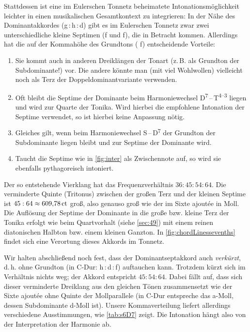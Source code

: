Stattdessen ist eine im Eulerschen Tonnetz beheimatete Intonationsmöglichkeit
leichter in einen musikalischen Gesamtkontext zu integrieren: In der Nähe des
Dominantakkordes (g\,:\,\naturalm h\,:\,d) gibt es im Eulerschen Tonnetz zwar
zwei unterschiedliche kleine Septimen (\natural f und \naturalp f), die in
Betracht kommen.  Allerdings hat die auf der Kommahöhe des Grundtons (\natural
f) entscheidende Vorteile:
\begin{enumerate}
\item Sie kommt auch in anderen Dreiklängen der Tonart (z.\,B. als Grundton der
  Subdominante!) vor.  Die andere könnte man (mit viel Wohlwollen) vielleicht
  noch als Terz der Doppeldominantvariante verwenden.
\item Oft bleibt die Septime der Dominante beim Harmoniewechsel
  D\textsuperscript{$7$}\,–\,T\textsuperscript{$4$–$3$} liegen und wird zur
  Quarte der Tonika.  Wird hierbei die empfohlene Intonation der Septime
  verwendet, so ist hierbei keine Anpassung nötig.
\item Gleiches gilt, wenn beim Harmoniewechsel S\,–\,D\textsuperscript{$7$} der
  Grundton der Subdominante liegen bleibt und zur Septime der Dominante wird.
\item Taucht die Septime wie in \cref{fig:inter} als Zwischennote auf, so wird
  sie ebenfalls pythagoreisch intoniert.
\end{enumerate}
Der so entstehende Vierklang hat das Frequenzverhältnis $36:45:54:64$. Die
verminderte Quinte (Tritonus) zwischen der großen Terz und der kleinen Septime
ist $45:64\approx 609{,}78\,\text{ct}$ groß, also genauso groß wie der im Sixte
ajoutée in Moll. Die Auflösung der Septime der Dominante in die große bzw.
kleine Terz der Tonika erfolgt wie beim Quartvorhalt (siehe \cref{sec:49}) mit
einem reinen diatonischen Halbton bzw. einem kleinen Ganzton. In
\cref{fig:chordLinessevenths} findet sich eine Verortung dieses Akkords im
Tonnetz.

Wir halten abschließend noch fest, dass der Dominantseptakkord auch
\emph{verkürzt}, d.\,h. ohne Grundton (in C-Dur: \naturalm h\,:\,d\,:\,f)
auftauchen kann. Trotzdem kürzt sich im Verhältnis nichts weg; der Akkord
entspricht $45:54:64$. Dabei fällt auf, dass sich dieser verminderte Dreiklang
aus den gleichen Tönen zusammensetzt wie der Sixte ajoutée ohne Quinte der
Mollparallele (in C-Dur entspreche das a-Moll, dessen Subdominante d-Moll ist).
Unsere Kommaverteilung liefert allerdings verschiedene Ausstimmungen, wie
\cref{tab:s6D7} zeigt. Die Intonation hängt also von der Interpretation der
Harmonie ab.



